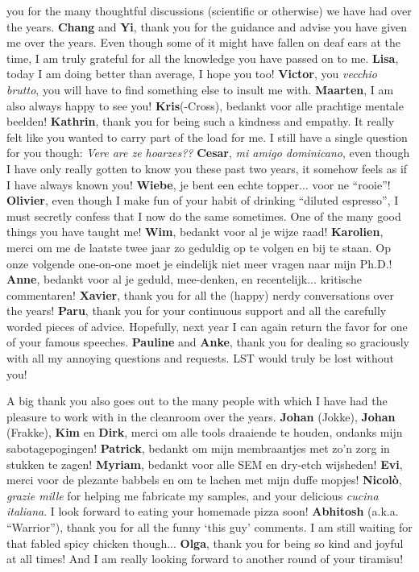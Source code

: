 you for the many thoughtful discussions (scientific or otherwise) we have had over the years. \textbf{Chang}
and \textbf{Yi}, thank you for the guidance and advise you have given me over the years. Even though some of
it might have fallen on deaf ears at the time, I am truly grateful for all the knowledge you have passed on to
me. \textbf{Lisa}, today I am doing better than average, I hope you too! \textbf{Victor}, you \textit{vecchio
brutto}, you will have to find something else to insult me with. \textbf{Maarten}, I am also always happy to
see you! \textbf{Kris}(-Cross), bedankt voor alle prachtige mentale beelden! \textbf{Kathrin}, thank you for
being such a kindness and empathy. It really felt like you wanted to carry part of the load for me. I still
have a single question for you though: \textit{Vere are ze hoarzes??} \textbf{Cesar}, \textit{mi amigo
dominicano}, even though I have only really gotten to know you these past two years, it somehow feels as if I
have always known you! \textbf{Wiebe}, je bent een echte topper... voor ne ``rooie''! \textbf{Olivier}, even
though I make fun of your habit of drinking ``diluted espresso'', I must secretly confess that I now do the
same sometimes. One of the many good things you have taught me! \textbf{Wim}, bedankt voor al je wijze raad!
\textbf{Karolien}, merci om me de laatste twee jaar zo geduldig op te volgen en bij te staan. Op onze volgende
one-on-one moet je eindelijk niet meer vragen naar mijn Ph.D.! \textbf{Anne}, bedankt voor al je geduld,
mee-denken, en recentelijk... kritische commentaren! \textbf{Xavier}, thank you for all the (happy) nerdy
conversations over the years! \textbf{Paru}, thank you for your continuous support and all the carefully
worded pieces of advice. Hopefully, next year I can again return the favor for one of your famous speeches.
\textbf{Pauline} and \textbf{Anke}, thank you for dealing so graciously with all my annoying questions and
requests. LST would truly be lost without you!

A big thank you also goes out to the many people with which I have had the pleasure to work with in the
cleanroom over the years. \textbf{Johan} (Jokke), \textbf{Johan} (Frakke), \textbf{Kim} en \textbf{Dirk},
merci om alle tools draaiende te houden, ondanks mijn sabotagepogingen! \textbf{Patrick}, bedankt om mijn
membraantjes met zo'n zorg in stukken te zagen! \textbf{Myriam}, bedankt voor alle SEM en dry-etch wijsheden!
\textbf{Evi}, merci voor de plezante babbels en om te lachen met mijn duffe mopjes! \textbf{Nicol\`{o}},
\textit{grazie mille} for helping me fabricate my samples, and your delicious \textit{cucina italiana}. I look
forward to eating your homemade pizza soon! \textbf{Abhitosh} (a.k.a. ``Warrior''), thank you for all the
funny `this guy' comments. I am still waiting for that fabled spicy chicken though... \textbf{Olga}, thank you
for being so kind and joyful at all times! And I am really looking forward to another round of your tiramisu!

